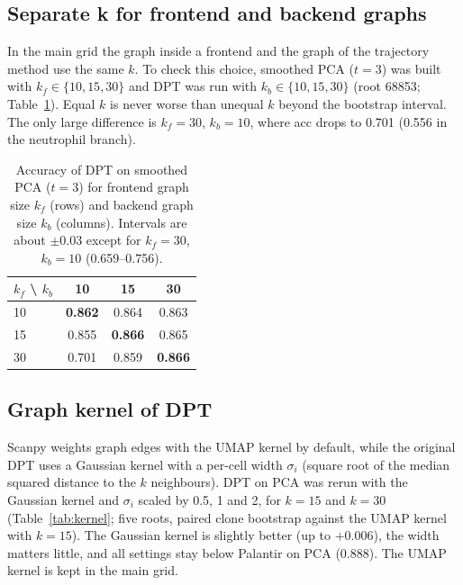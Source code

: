 \documentclass[10pt,a4paper,twocolumn]{article}
\begin{document}
\subsection{Separate k for frontend and backend graphs}
In the main grid the graph inside a frontend and the graph of the trajectory method use the same
$k$. To check this choice, smoothed PCA ($t=3$) was built with $k_f \in \{10, 15, 30\}$ and DPT
was run with $k_b \in \{10, 15, 30\}$ (root 68853; Table~\ref{tab:kcross}). Equal $k$ is never
worse than unequal $k$ beyond the bootstrap interval. The only large difference is $k_f=30$,
$k_b=10$, where acc drops to 0.701 (0.556 in the neutrophil branch).

\begin{table}[ht]
\centering\small
\caption{Accuracy of DPT on smoothed PCA ($t=3$) for frontend graph size $k_f$ (rows) and
backend graph size $k_b$ (columns). Intervals are about $\pm 0.03$ except for $k_f=30$, $k_b=10$
(0.659--0.756).}
\label{tab:kcross}
\begin{tabular}{lccc}
\toprule
$k_f$ \textbackslash{} $k_b$ & 10 & 15 & 30 \\
\midrule
10 & \textbf{0.862} & 0.864 & 0.863 \\
15 & 0.855 & \textbf{0.866} & 0.865 \\
30 & 0.701 & 0.859 & \textbf{0.866} \\
\bottomrule
\end{tabular}
\end{table}

\subsection{Graph kernel of DPT}
Scanpy weights graph edges with the UMAP kernel by default, while the original DPT uses a Gaussian
kernel with a per-cell width $\sigma_i$ (square root of the median squared distance to the $k$
neighbours). DPT on PCA was rerun with the Gaussian kernel and $\sigma_i$ scaled by 0.5, 1 and 2,
for $k=15$ and $k=30$ (Table~\ref{tab:kernel}; five roots, paired clone bootstrap against the UMAP
kernel with $k=15$). The Gaussian kernel is slightly better (up to $+0.006$), the width matters
little, and all settings stay below Palantir on PCA (0.888). The UMAP kernel is kept in the main
grid.
\end{document}

